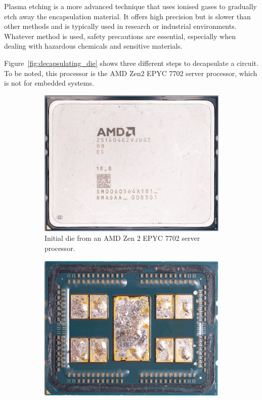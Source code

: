 Plasma etching is a more advanced technique that uses ionised gases to gradually etch away the encapsulation material. It offers high precision but is slower than other methods and is typically used in research or industrial environments. Whatever method is used, safety precautions are essential, especially when dealing with hazardous chemicals and sensitive materials.

Figure~\ref{fig:decapsulating_die} shows three different steps to decapsulate a circuit. To be noted, this processor is the AMD Zen2 EPYC 7702 server processor, which is not for embedded systems.

\begin{figure}[ht]
    \centering
    \begin{subfigure}[b]{0.3\textwidth}
        \includegraphics[width=\textwidth]{c2_soa/img/epyc_7702_initial.jpg}
        \caption{Initial die from an AMD Zen 2 EPYC 7702 server processor.}
        \label{fig:initial_die}
    \end{subfigure}
    \hfill
    \begin{subfigure}[b]{0.3\textwidth}
        \includegraphics[width=\textwidth]{c2_soa/img/epyc_7702_delidding.jpg}

\end{subfigure}
\end{figure}
